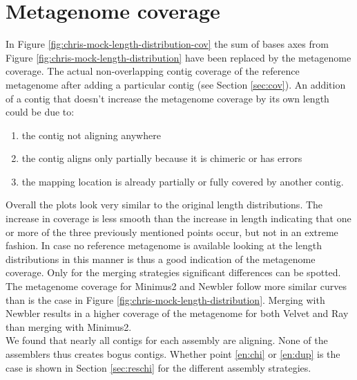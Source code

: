 \documentclass[a4paper,12pt]{report}
\begin{document}
\section{Metagenome coverage}
In Figure \ref{fig:chris-mock-length-distribution-cov} the sum of bases
axes from Figure \ref{fig:chris-mock-length-distribution} have been
replaced by the metagenome coverage. The actual non-overlapping contig coverage
of the reference metagenome after adding a particular contig (see Section
\ref{sec:cov}).  An addition of a contig that doesn't increase the metagenome
coverage by its own length could be due to:
\begin{enumerate}
\item\label{en:aln} the contig not aligning anywhere
\item\label{en:chi} the contig aligns only partially because it is chimeric or has errors
\item\label{en:dup} the mapping location is already partially or fully covered by another
contig.
\end{enumerate}
Overall the plots look very similar to the original length distributions.  The
increase in coverage is less smooth than the increase in length indicating that
one or more of the three previously mentioned points occur, but not in an
extreme fashion. In case no reference metagenome is available looking at the
length distributions in this manner is thus a good indication of the metagenome
coverage. Only for the merging strategies significant differences can be
spotted. The metagenome coverage for Minimus2 and Newbler follow more similar
curves than is the case in Figure \ref{fig:chris-mock-length-distribution}.
Merging with Newbler results in a higher coverage of the metagenome for both
Velvet and Ray than merging with Minimus2.\\


We found that nearly all contigs for each assembly are aligning. None of the
assemblers thus creates bogus contigs. Whether point \ref{en:chi} or
\ref{en:dup} is the case is shown in Section \ref{sec:reschi} for the different
assembly strategies.



\end{document}
